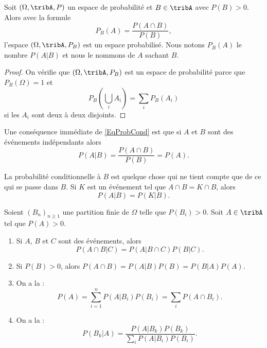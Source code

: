 \begin{propositionDef}      \label{DEFooGJVHooVbhVYv}
    Soit \( (\Omega,\tribA,P)\) un espace de probabilité et \( B\in\tribA\) avec $P(B)>0$. Alors avec la formule
    \begin{equation}    \label{EqProbCond}
        P_B(A)=\frac{ P(A\cap B) }{ P(B) },
    \end{equation}
    l'espace \( (\Omega,\tribA,P_B)\) est un espace probabilisé. Nous notons \( P_B(A)  \) le nombre \( P(A|B)\) et nous le nommons  de \( A\) sachant \( B\).
\end{propositionDef}

\begin{proof}
    On vérifie que \( (\Omega,\tribA,P_B)\) est un espace de probabilité parce que \( P_B(\Omega)=1\) et
    \begin{equation}
        P_B(\bigcup_iA_i)=\sum_iP_B(A_i)
    \end{equation}
    si les \( A_i\) sont deux à deux disjoints.
\end{proof}

Une conséquence immédiate de \eqref{EqProbCond} est que si \( A\) et \( B\) sont des événements indépendants alors
\begin{equation}
    P(A|B)=\frac{ P(A\cap B) }{ P(B) }=P(A).
\end{equation}

La probabilité conditionnelle à \( B\) est quelque chose qui ne tient compte que de ce qui se passe dans \( B\). Si \( K\) est un événement tel que \( A\cap B=K\cap B\), alors
\begin{equation}    \label{EqOVHCWom}
    P(A|B)=P(K|B).
\end{equation}

\begin{theorem}     \label{ThoBayesEtAutres}
    Soient \( (B_n)_{n\geq 1}\) une partition finie de \( \Omega\) telle que \( P(B_i)>0\). Soit \( A\in\tribA\) tel que \( P(A)>0\).
    \begin{enumerate}
        \item
            Si \( A\), \( B\) et \( C\) sont des événements, alors
            \begin{equation}
                P(A\cap B|C)=P(A|B\cap C)P(B|C).
            \end{equation}
        \item
            Si \( P(B)>0\), alors \( P(A\cap B)=P(A|B)P(B)=P(B|A)P(A)\).
        \item On a la  :
            \begin{equation}
                P(A)=\sum_{i=1}^nP(A|B_i)P(B_i)=\sum_iP(A\cap B_i).
            \end{equation}
        \item
            On a la  :
            \begin{equation}
                P(B_k|A)=\frac{ P(A|B_k)P(B_k) }{ \sum_iP(A|B_i)P(B_i) }.
            \end{equation}
    \end{enumerate}
\end{theorem}

